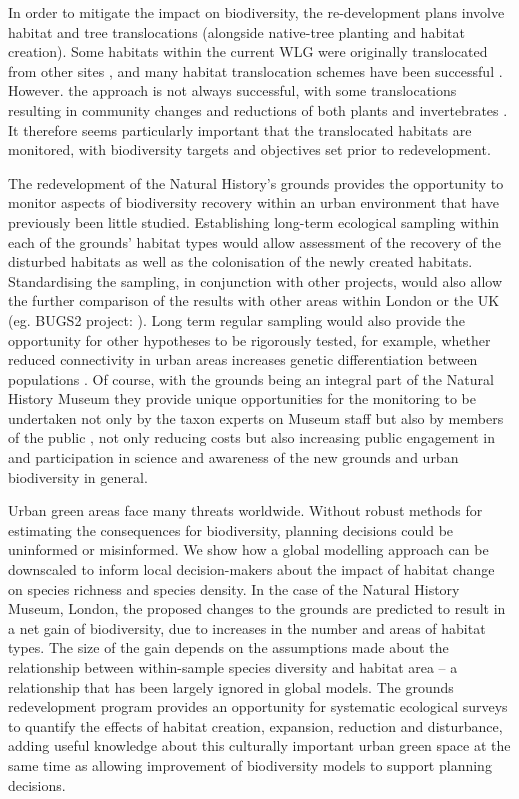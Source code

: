 In order to mitigate the impact on biodiversity, the re-development plans involve habitat and tree translocations (alongside native-tree planting and habitat creation). Some habitats within the current WLG were originally translocated from other sites \citep{Honey:1999ln,Leigh:2003ln}, and many habitat translocation schemes have been successful \citep{dunford:2010,Twyford:2012}. However. the approach is not always successful, with some translocations resulting in community changes and reductions of both plants and invertebrates \citep{Bullock:1998bc,jncc:2003ht}. It therefore seems particularly important that the translocated habitats are monitored, with biodiversity targets and objectives set prior to redevelopment. 

The redevelopment of the Natural History's grounds provides the opportunity to monitor aspects of biodiversity recovery within an urban environment that have previously been little studied. Establishing long-term ecological sampling within each of the grounds' habitat types would allow assessment of the recovery of the disturbed habitats as well as the colonisation of the newly created habitats. Standardising the sampling, in conjunction with other projects, would also allow the further comparison of the results with other areas within London \citep[e.g.,][]{Smith:2006ue} or the UK (eg. BUGS2 project: \citealt{Loram:2007le}). Long term regular sampling would also provide the opportunity for other hypotheses to be rigorously tested, for example, whether reduced connectivity in urban areas increases genetic differentiation between populations \citep{Johnson:2015ajb}. Of course, with the grounds being an integral part of the Natural History Museum they provide unique opportunities for the monitoring to be undertaken not only by the taxon experts on Museum staff but also by members of the public \citep{Silvertown:2009tree,Roy:2012citsci}, not only reducing costs but also increasing public engagement in and participation in science and awareness of the new grounds and urban biodiversity in general. 

Urban green areas face many threats worldwide. Without robust methods for estimating the consequences for biodiversity, planning decisions could be uninformed or misinformed. We show how a global modelling approach can be downscaled to inform local decision-makers about the impact of habitat change on species richness and species density. In the case of the Natural History Museum, London, the proposed changes to the grounds are predicted to result in a net gain of biodiversity, due to increases in the number and areas of habitat types. The size of the gain depends on the assumptions made about the relationship between within-sample species diversity and habitat area -- a relationship that has been largely ignored in global models. The grounds redevelopment program provides an opportunity for systematic ecological surveys to quantify the effects of habitat creation, expansion, reduction and disturbance, adding useful knowledge about this culturally important urban green space at the same time as allowing improvement of biodiversity models to support planning decisions.

